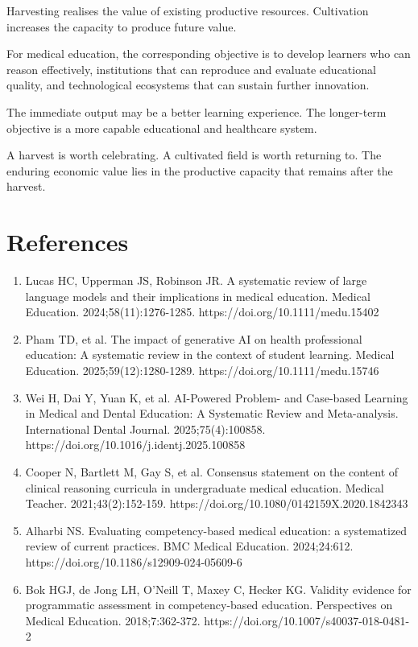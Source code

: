 \documentclass[11pt,a4paper]{article}
\begin{document}
Harvesting realises the value of existing productive resources. Cultivation increases the capacity to produce future value.

For medical education, the corresponding objective is to develop learners who can reason effectively, institutions that can reproduce and evaluate educational quality, and technological ecosystems that can sustain further innovation.

The immediate output may be a better learning experience. The longer-term objective is a more capable educational and healthcare system.

A harvest is worth celebrating. A cultivated field is worth returning to. The enduring economic value lies in the productive capacity that remains after the harvest.

\section*{References}\begin{enumerate}[leftmargin=*]
\item Lucas HC, Upperman JS, Robinson JR. A systematic review of large language models and their implications in medical education. Medical Education. 2024;58(11):1276-1285. https://doi.org/10.1111/medu.15402
\item Pham TD, et al. The impact of generative AI on health professional education: A systematic review in the context of student learning. Medical Education. 2025;59(12):1280-1289. https://doi.org/10.1111/medu.15746
\item Wei H, Dai Y, Yuan K, et al. AI-Powered Problem- and Case-based Learning in Medical and Dental Education: A Systematic Review and Meta-analysis. International Dental Journal. 2025;75(4):100858. https://doi.org/10.1016/j.identj.2025.100858
\item Cooper N, Bartlett M, Gay S, et al. Consensus statement on the content of clinical reasoning curricula in undergraduate medical education. Medical Teacher. 2021;43(2):152-159. https://doi.org/10.1080/0142159X.2020.1842343
\item Alharbi NS. Evaluating competency-based medical education: a systematized review of current practices. BMC Medical Education. 2024;24:612. https://doi.org/10.1186/s12909-024-05609-6
\item Bok HGJ, de Jong LH, O'Neill T, Maxey C, Hecker KG. Validity evidence for programmatic assessment in competency-based education. Perspectives on Medical Education. 2018;7:362-372. https://doi.org/10.1007/s40037-018-0481-2

\end{enumerate}
\end{document}
